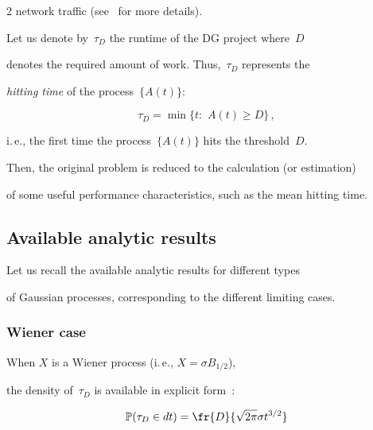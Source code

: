 \begin{multicols}{2}
 network traffic (see~\cite{15-luk-1} for more details). 





Let us denote  by~$\tau_D$ the  runtime of the  DG project where~$D$ 

denotes the required amount of work. Thus,~$\tau_D$ represents the  

\textit{hitting time} of  the process~$\{A(t)\}$:  

\begin{equation*}

\tau_D = \min\{t:\,\, A(t)\ge D \} \, ,

\end{equation*}

i.\,e., the first time the process~$\{A(t)\}$ hits the threshold~$D$.

Then, the original problem is reduced to the calculation (or estimation)

 of some useful performance characteristics, such as the mean  hitting time.



\subsection{Available analytic results}



\noindent

Let us recall the available analytic results for different types 

of Gaussian processes, corresponding to the different limiting cases. 



\vspace*{-4pt}



\subsubsection{Wiener case}



\noindent

When $X$ is a Wiener process (i.\,e., $X = \sigma B_{1/2}$), 

the  density of~$\tau_D$ is available in  explicit form~\cite{16-luk-1}:

\begin{multline}

\mathbb{P}(\tau_D \in dt)= \fr{D}{\sqrt{2\pi}\sigma t^{3/2}} 


\end{multline}
\end{multicols}
